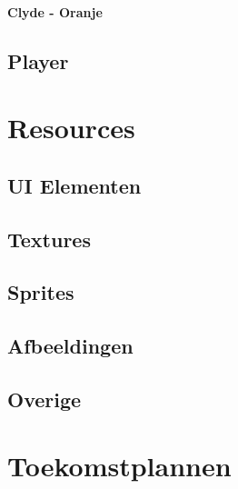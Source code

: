 \documentclass{report}
\begin{document}

      \subsubsection{Clyde - Oranje} %
      \label{ssub:clyde}


  \section{Player} %
  \label{sec:player}


\chapter{Resources} %
\label{cha:resources}

  \section{UI Elementen} %
  \label{sec:ui_elementen}


  \section{Textures} %
  \label{sec:textures}


  \section{Sprites} %
  \label{sec:sprites}


  \section{Afbeeldingen} %
  \label{sec:afbeeldingen}


  \section{Overige} %
  \label{sec:overige}


\chapter{Toekomstplannen} %
\label{cha:toekomstplannen}

\end{document}
